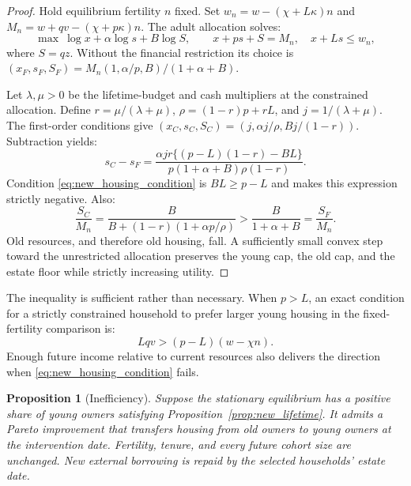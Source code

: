 \documentclass[11pt]{article}
\newtheorem{proposition}{Proposition}
\begin{document}
\begin{proof}
Hold equilibrium fertility $n$ fixed. Set
$w_n=w-(\chi+L\kappa)n$ and $M_n=w+qv-(\chi+p\kappa)n$.
The adult allocation solves:
\begin{equation}
\max\ \log x+\alpha\log s+B\log S,\qquad
x+ps+S=M_n,\quad x+Ls\le w_n,
\label{eq:new_fixed_n}
\end{equation}
where $S=qz$. Without the financial restriction its choice is
$(x_F,s_F,S_F)=M_n(1,\alpha/p,B)/(1+\alpha+B)$.

Let $\lambda,\mu>0$ be the lifetime-budget and cash multipliers at the
constrained allocation. Define $r=\mu/(\lambda+\mu)$,
$\rho=(1-r)p+rL$, and $j=1/(\lambda+\mu)$. The first-order conditions give
$(x_C,s_C,S_C)=(j,\alpha j/\rho,Bj/(1-r))$. Subtraction yields:
\begin{equation}
s_C-s_F=
\frac{\alpha jr\{(p-L)(1-r)-BL\}}
{p(1+\alpha+B)\rho(1-r)}.
\label{eq:new_housing_identity}
\end{equation}
Condition \eqref{eq:new_housing_condition} is $BL\ge p-L$ and makes this
expression strictly negative. Also:
\begin{equation}
\frac{S_C}{M_n}
=\frac B{B+(1-r)(1+\alpha p/\rho)}
>\frac B{1+\alpha+B}=\frac{S_F}{M_n}.
\end{equation}
Old resources, and therefore old housing, fall. A sufficiently small convex
step toward the unrestricted allocation preserves the young cap, the old
cap, and the estate floor while strictly increasing utility.
\end{proof}

The inequality is sufficient rather than necessary. When $p>L$, an exact
condition for a strictly constrained household to prefer larger young housing
in the fixed-fertility comparison is:
\begin{equation}
Lqv>(p-L)(w-\chi n).
\label{eq:new_exact_income}
\end{equation}
Enough future income relative to current resources also delivers the direction
when \eqref{eq:new_housing_condition} fails.

\begin{proposition}[Inefficiency]
Suppose the stationary equilibrium has a positive share of young owners
satisfying Proposition~\ref{prop:new_lifetime}. It admits a Pareto improvement
that transfers housing from old owners to young owners at the intervention
date. Fertility, tenure, and every future cohort size are unchanged. New
external borrowing is repaid by the selected households' estate date.
\label{prop:new_pareto}
\end{proposition}
\end{document}
